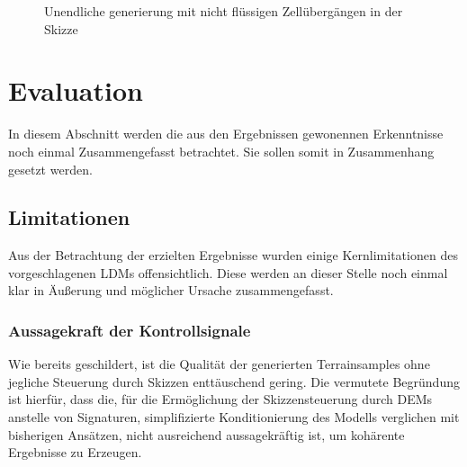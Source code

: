 \begin{figure}[htbp]
    \centering

    \vspace{-8pt}

    \caption{Unendliche generierung mit nicht flüssigen Zellübergängen in der Skizze}
    \label{fig:disconnected}
\end{figure}


\section{Evaluation}

In diesem Abschnitt werden die aus den Ergebnissen gewonennen Erkenntnisse noch einmal Zusammengefasst betrachtet. Sie sollen somit in Zusammenhang gesetzt werden.  

\subsection{Limitationen}

Aus der Betrachtung der erzielten Ergebnisse wurden einige Kernlimitationen des vorgeschlagenen \ac{LDM}s offensichtlich. Diese werden an dieser Stelle noch einmal klar in Äußerung und möglicher Ursache zusammengefasst.

\subsubsection{Aussagekraft der Kontrollsignale}

Wie bereits geschildert, ist die Qualität der generierten Terrainsamples ohne jegliche Steuerung durch Skizzen enttäuschend gering. Die vermutete Begründung ist hierfür, dass die, für die Ermöglichung der Skizzensteuerung durch \ac{DEM}s anstelle von Signaturen, simplifizierte Konditionierung des Modells verglichen mit bisherigen Ansätzen, nicht ausreichend aussagekräftig ist, um kohärente Ergebnisse zu Erzeugen. 

